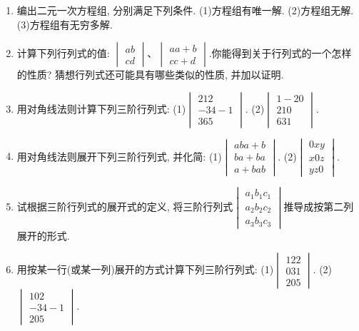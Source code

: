 \documentclass[10pt,a4paper]{article}
\begin{document}
\begin{enumerate}[1.]
\item 编出二元一次方程组, 分别满足下列条件.
(1)方程组有唯一解.
(2)方程组无解.
(3)方程组有无穷多解.
\item 计算下列行列式的值: $\begin{vmatrix}
    a  b  \\c  d  \end{vmatrix}$、$\begin{vmatrix}
    a  a+b  \\c  c+d  \end{vmatrix}$.你能得到关于行列式的一个怎样的性质? 猜想行列式还可能具有哪些类似的性质, 并加以证明.
\item 用对角线法则计算下列三阶行列式:
(1)$\begin{vmatrix}
    2  1  2  \\-3  4  -1  \\3  6  5  \end{vmatrix}$. (2)$\begin{vmatrix}
    1  -2  0  \\2  1  0  \\6  3  1  \end{vmatrix}$.
\item 用对角线法则展开下列三阶行列式, 并化简:
(1)$\begin{vmatrix}
    a  b  a+b  \\b  a+b  a  \\a+b  a  b  \end{vmatrix}$. (2)$\begin{vmatrix}
    0  x  y  \\x  0  z  \\y  z  0  \end{vmatrix}$.
\item 试根据三阶行列式的展开式的定义, 将三阶行列式$\begin{vmatrix}
    a_1  b_1  c_1  \\a_2  b_2  c_2  \\a_3  b_3  c_3  \end{vmatrix}$推导成按第二列展开的形式.
\item 用按某一行(或某一列)展开的方式计算下列三阶行列式:
(1)$\begin{vmatrix}
    1  2  2  \\0  3  1  \\2  0  5  \end{vmatrix}$. (2)$\begin{vmatrix}
    1  0  2  \\-3  4  -1  \\2  0  5  \end{vmatrix}$.

\end{enumerate}
\end{document}
